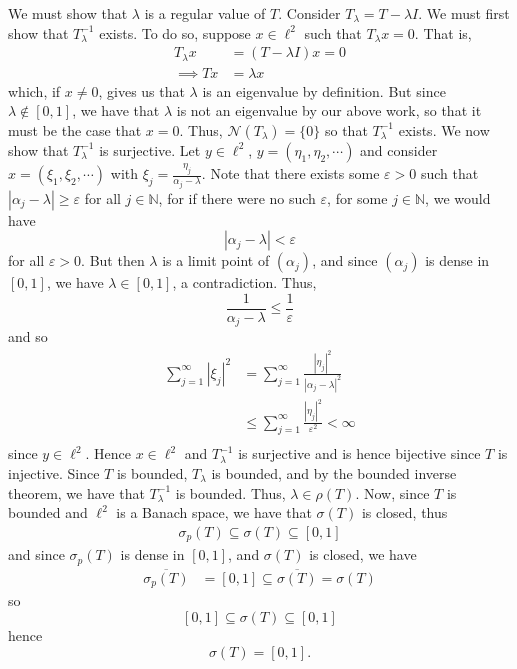 \documentclass{article}
\begin{document}
\begin{itemize}
    \newline
    We must show that $\lambda$ is a regular value of $T$. Consider $T_{\lambda} = T - \lambda I$. We must first show that $T_{\lambda}^{-1}$ exists. To do so, suppose $x \in \ell^2$ such that $T_{\lambda}x = 0$. That is,
    \begin{align*}
        T_{\lambda}x &= (T - \lambda I)x = 0\\
        \implies Tx &= \lambda x
    \end{align*}
    which, if $x \neq 0$, gives us that $\lambda$ is an eigenvalue by definition. But since $\lambda \notin [0,1]$, we have that $\lambda$ is not an eigenvalue by our above work, so that it must be the case that $x = 0$. Thus, $\mathcal{N}(T_{\lambda}) = \{0\}$ so that $T_{\lambda}^{-1}$ exists. We now show that $T^{-1}_{\lambda}$ is surjective. Let $y \in \ell^2$, $y = (\eta_1, \eta_2, \cdots)$ and consider $x = (\xi_1, \xi_2, \cdots)$ with $\xi_j = \frac{\eta_j}{\alpha_j - \lambda}$. Note that there exists some $\varepsilon > 0$ such that $|\alpha_j - \lambda| \geq \varepsilon$ for all $j \in \mathbb{N}$, for if there were no such $\varepsilon$, for some $j \in \mathbb{N}$, we would have
    \[|\alpha_j - \lambda| < \varepsilon\]
    for all $\varepsilon > 0$. But then $\lambda$ is a limit point of $(\alpha_j)$, and since $(\alpha_j)$ is dense in $[0,1]$, we have $\lambda \in [0,1]$, a contradiction. Thus,
    \[\frac{1}{\alpha_j - \lambda} \leq \frac{1}{\varepsilon}\]
    and so
    \begin{align*}
        \sum_{j = 1}^{\infty} |\xi_j|^2 &= \sum_{j = 1}^{\infty} \frac{|\eta_j|^2}{|\alpha_j - \lambda|^2}\\
        &\leq \sum_{j = 1}^{\infty} \frac{|\eta_j|^2}{\varepsilon^2} < \infty\\
    \end{align*}
    since $y \in \ell^2$. Hence $x \in \ell^2$ and $T_{\lambda}^{-1}$ is surjective and is hence bijective since $T$ is injective. Since $T$ is bounded, $T_{\lambda}$ is bounded, and by the bounded inverse theorem, we have that $T_{\lambda}^{-1}$ is bounded. Thus, $\lambda \in \rho(T)$.
    \newline\newline
    Now, since $T$ is bounded and $\ell^2$ is a Banach space, we have that $\sigma(T)$ is closed, thus
    \begin{align*}
        \sigma_p(T) \subseteq \sigma(T) \subseteq [0,1]
    \end{align*}
    and since $\sigma_p(T)$ is dense in $[0,1]$, and $\sigma(T)$ is closed, we have
    \begin{align*}
        \overline{\sigma_p(T)} &= [0,1] \subseteq \overline{\sigma(T)} = \sigma(T)
    \end{align*}
    so
    \[[0,1] \subseteq \sigma(T) \subseteq [0,1]\]
    hence
    \[\sigma(T) = [0,1].\]
\end{itemize}
\end{document}
